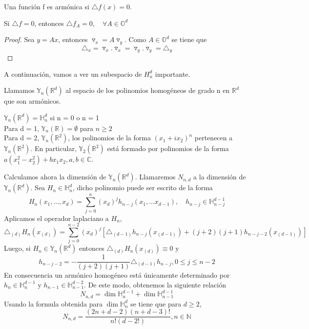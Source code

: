 \begin{defn}
Una función f es armónica si $\triangle f (x) = 0$. 
\end{defn}
\begin{lem}
	Si $\triangle f = 0$, entonces $\triangle f_A = 0, \quad \forall A \in \mathds{O}^d$
\end{lem}
\begin{proof}
	Sea $ y = Ax$, entonces $\triangledown_x = A \triangledown_y$. Como $ A \in \mathds{O}^d$ se tiene que 
	$$
	\triangle_x = \triangledown_x . \triangledown_x = \triangledown_y . \triangledown_y = \triangle_y
	$$ 
\end{proof}
A continuación, vamos a ver un subespacio de $H^d_n$ importante.
\begin{defn}
Llamamos $\mathds{Y}_n(\mathds{R}^d)$ al espacio de los polinomios homogéneos de grado n en $\mathds{R}^d$ que son armónicos.
\end{defn}
\begin{example}
$\mathds{Y}_n(\mathds{R}^d) = \mathds{H}^d_n$ si n = 0 o n = 1\\
Para d = 1, $\mathds{Y}_n(\mathds{R})=\emptyset$ para $n\ge 2$\\
Para d = 2, $\mathds{Y}_n(\mathds{R}^2)$, los polinomios de la forma $(x_1 + ix_2) ^n$ pertenecen a $\mathds{Y}_n(\mathds{R}^2).$ En particular,  $\mathds{Y}_2(\mathds{R}^2)$ está formado por polinomios de la forma $a(x_1^2-x_2^2)+bx_1x_2, a,b\in\mathds{C}$.
\end{example} 
Calculamos ahora la dimensión de $\mathds{Y}_n(\mathds{R}^d)$. Llamaremos $N_{n,d}$ a la dimensión de $\mathds{Y}_n(\mathds{R}^d)$.
Sea $H_{n}\in\mathds{H}_n^d$, dicho polinomio puede ser escrito de la forma
$$
H_n(x_1,...,x_d) = \sum_{j=0}^{n}(x_d)^jh_{n-j}(x_1,...x_{d-1}),\quad		h_{n-j}\in\mathds{H}_{n-j}^{d-1}
$$
Aplicamos el operador laplaciano a $H_n$,
$$
\triangle_{(d)}H_n(x_{(d)}) = \sum_{j=0}^{n-2}(x_d)^j[\triangle_{(d-1)}h_{n-j}(x_{(d-1)})+(j+2)(j+1)h_{n-j-2}(x_{(d-1)})]
$$
Luego, si $H_n \in \mathds{Y}_n(\mathds{R}^d) $ entonces $\triangle_{(d)}H_n(x_{(d)}) \equiv 0$ y
$$
h_{n-j-2} = -\frac{1}{(j+2)(j+1)}\triangle_{(d-1)}h_{n-j},		0 \le j \le n-2
$$
En consecuencia un armónico homogéneo está únicamente determinado por $h_n \in \mathds{H}_n^{d-1}$ y $h_{n-1} \in \mathds{H}_{n-1}^{d-2}$. De este modo, obtenemos la siguiente relación
$$
N_{n,d} = \dim \mathds{H}_n^{d-1}+ \dim \mathds{H}_{n-1}^{d-1}
$$
Usando la formula obtenida para $\dim \mathds{H}_n^d$ se tiene que para $d\ge 2$,
$$
N_{n,d} = \frac{(2n+d-2)(n+d-3)!}{n!(d-2!)},	n\in\mathds{N}
$$
